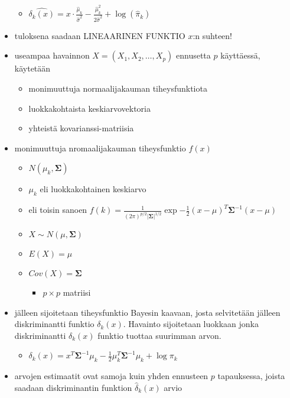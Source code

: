 \documentclass[finnish,twoside,openright]{HYgraduMLDS}
\begin{document}
\begin{itemize}
    \begin{itemize}
        \item $\hat{\delta_k(x)} = x \cdot \frac{\hat{\mu}_k}{\hat{\sigma}^2} - \frac{\hat{\mu}^2_k}{2 \hat{\sigma}^2} + \log(\hat{\pi}_k)$
    \end{itemize}
    \item tuloksena saadaan LINEAARINEN FUNKTIO $x$:n suhteen!
    \item useampaa havainnon $X = (X_1, X_2, \dots, X_p)$ ennusetta $p$ käyttäessä, käytetään
    \begin{itemize}
        \item monimuuttuja normaalijakauman tiheysfunktiota
        \item luokkakohtaista keskiarvovektoria
        \item yhteistä kovarianssi-matriisia
    \end{itemize}
    \item monimuuttuja nromaalijakauman tiheysfunktio $f(x)$
    \begin{itemize}
        \item $N(\mu_k, \pmb{\Sigma})$
        \item $\mu_k$ eli luokkakohtainen keskiarvo
        \item eli toisin sanoen $f(k) = \frac{1}{(2\pi)^{p/2} |\pmb{\Sigma}|^{1/2}} \exp{-\frac{1}{2} (x - \mu)^T \pmb{\Sigma}^{-1} (x - \mu)}$
        \item $X \sim N(\mu, \pmb{\Sigma})$
        \item $E(X) = \mu$
        \item $Cov(X) = \pmb{\Sigma}$
        \begin{itemize}
            \item $p \times p$ matriisi
        \end{itemize}
    \end{itemize}
    \item jälleen sijoitetaan tiheysfunktio Bayesin kaavaan, josta selvitetään jälleen diskriminantti funktio $\delta_k(x)$. Havainto sijoitetaan luokkaan jonka diskriminantti $\delta_k(x)$ funktio tuottaa suurimman arvon.
    \begin{itemize}
        \item $\delta_k(x) = x^T \pmb{\Sigma}^{-1} \mu_k - \frac{1}{2} \mu_k^T \pmb{\Sigma}^{-1} \mu_k + \log \pi_k$
    \end{itemize}
    \item arvojen estimaatit ovat samoja kuin yhden ennusteen $p$ tapauksessa, joista saadaan diskriminantin funktion $\hat{\delta}_k(x)$ arvio
\end{itemize}
\end{document}
